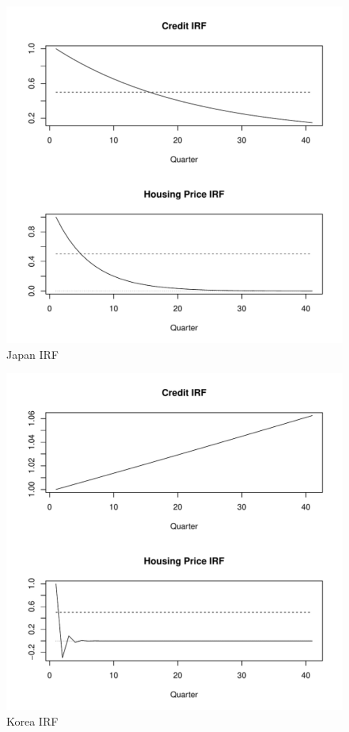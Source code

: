 \documentclass[fleqn]{article}
\begin{document}
\begin{outline}[enumerate]
\begin{figure}[h!]
	\caption{Japan IRF}	
	\centerline{\includegraphics[scale=0.7]{../Output/Graphs/IRF_JP.pdf}}
\end{figure}

\begin{figure}[h!]
	\caption{Korea IRF}	
	\centerline{\includegraphics[scale=0.7]{../Output/Graphs/IRF_KR.pdf}}
\end{figure}

\end{outline}
\end{document}
